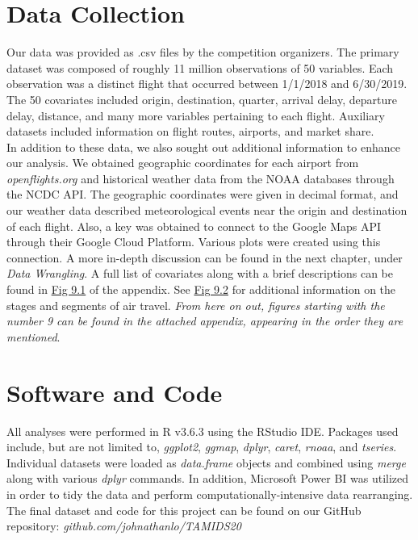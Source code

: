\documentclass[12pt, a4paper, openany]{book}
\newcommand\tab[1][1cm]{\hspace*{#1}}
\begin{document}
	\section{Data Collection}
	\tab Our data was provided as .csv files by the competition organizers. The primary dataset was composed of roughly 11 million observations of 50 variables. Each observation was a distinct flight that occurred between 1/1/2018 and 6/30/2019. The 50 covariates included origin, destination, quarter, arrival delay, departure delay, distance, and many more variables pertaining to each flight. Auxiliary datasets included information on flight routes, airports, and market share. \\
	\tab In addition to these data, we also sought out additional information to enhance our analysis. We obtained geographic coordinates for each airport from \textit{openflights.org} and historical weather data from the NOAA databases through the NCDC API. The geographic coordinates were given in decimal format, and our weather data described meteorological events near the origin and destination of each flight. Also, a key was obtained to connect to the Google Maps API through their Google Cloud Platform. Various plots were created using this connection. A more in-depth discussion can be found in the next chapter, under \textit{Data Wrangling}. A full list of covariates along with a brief descriptions can be found in \underline{Fig 9.1} of the appendix. See \underline{Fig 9.2} for additional information on the stages and segments of air travel. \textit{From here on out, figures starting with the number 9 can be found in the attached appendix, appearing in the order they are mentioned}. 
	\section{Software and Code}
	\tab All analyses were performed in R v3.6.3 using the RStudio IDE. Packages used include, but are not limited to, \textit{ggplot2}, \textit{ggmap}, \textit{dplyr}, \textit{caret}, \textit{rnoaa}, and \textit{tseries}. Individual datasets were loaded as \textit{data.frame} objects and combined using \textit{merge} along with various \textit{dplyr} commands. In addition, Microsoft Power BI was utilized in order to tidy the data and perform computationally-intensive data rearranging. The final dataset and code for this project can be found on our GitHub repository: \textit{github.com/johnathanlo/TAMIDS20}\\
\end{document}
